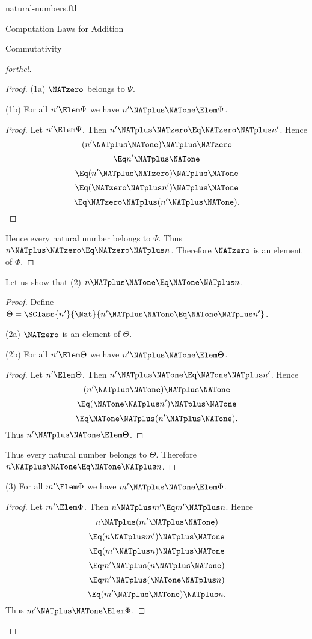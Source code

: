 \documentclass{stex}
\begin{document}
\begin{smodule}{natural-numbers.ftl}
\begin{sfragment}{Computation Laws for Addition}
\begin{sfragment}{Commutativity}
\begin{proof}[forthel]
\begin{proof}
        (1a) $\NATzero$ belongs to $\Psi$.

        (1b) For all $n' \Elem \Psi$ we have $n' \NATplus \NATone \Elem \Psi$.
        \begin{proof}
          Let $n' \Elem \Psi$.
          Then $n' \NATplus \NATzero \Eq \NATzero \NATplus n'$.
          Hence
          \[  (n' \NATplus \NATone) \NATplus \NATzero        \]
          \[    \Eq n' \NATplus \NATone          \]
          \[    \Eq (n' \NATplus \NATzero) \NATplus \NATone    \]
          \[    \Eq (\NATzero \NATplus n') \NATplus \NATone    \]
          \[    \Eq \NATzero \NATplus (n' \NATplus \NATone).   \]
        \end{proof}

        Hence every natural number belongs to $\Psi$.
        Thus $n \NATplus \NATzero \Eq \NATzero \NATplus n$.
        Therefore $\NATzero$ is an element of $\Phi$.
      \end{proof}

      Let us show that (2) $n \NATplus \NATone \Eq \NATone \NATplus n$.
      \begin{proof}
        Define $\Theta = \SClass{n'}{\Nat}{n' \NATplus \NATone \Eq \NATone \NATplus n'}$.

        (2a) $\NATzero$ is an element of $\Theta$.

        (2b) For all $n' \Elem \Theta$ we have $n' \NATplus \NATone \Elem \Theta$.
        \begin{proof}
          Let $n' \Elem \Theta$.
          Then $n' \NATplus \NATone \Eq \NATone \NATplus n'$.
          Hence
          \[  (n' \NATplus \NATone) \NATplus \NATone        \]
          \[    \Eq (\NATone \NATplus n') \NATplus \NATone    \]
          \[    \Eq \NATone \NATplus (n' \NATplus \NATone).   \]
          Thus $n' \NATplus \NATone \Elem \Theta$.
        \end{proof}

        Thus every natural number belongs to $\Theta$.
        Therefore $n \NATplus \NATone \Eq \NATone \NATplus n$.
      \end{proof}

      (3) For all $m' \Elem \Phi$ we have $m' \NATplus \NATone \Elem \Phi$.
      \begin{proof}
        Let $m' \Elem \Phi$.
        Then $n \NATplus m' \Eq m' \NATplus n$.
        Hence
        \[  n \NATplus (m'  \NATplus \NATone)       \]
        \[    \Eq (n \NATplus m') \NATplus \NATone    \]
        \[    \Eq (m' \NATplus n) \NATplus \NATone    \]
        \[    \Eq m' \NATplus (n \NATplus \NATone)    \]
        \[    \Eq m' \NATplus (\NATone \NATplus n)    \]
        \[    \Eq (m' \NATplus \NATone) \NATplus n.   \]
        Thus $m' \NATplus \NATone \Elem \Phi$.
      \end{proof}


\end{proof}
\end{sfragment}
\end{sfragment}
\end{smodule}
\end{document}
